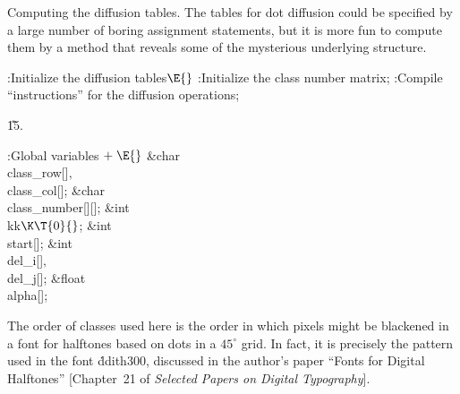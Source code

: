 Computing the diffusion tables. The tables for dot
diffusion could be
specified by a large number of boring assignment statements, but it is more
fun to compute them by a method that reveals some of the mysterious underlying
structure.

\Y\B\4:Initialize the diffusion tables\X${}\E{}$\6
:Initialize the class number matrix\X;\6
:Compile ``instructions'' for the diffusion operations\X;\par
\U15.\fi

\B{}:Global variables\X${}\mathrel+\E{}$\6
\&{char} \\{class\_row}[]${},{}$ \\{class\_col}[];\6
\&{char} \\{class\_number}[][];%
\6
\&{int} \\{kk}${}\K\T{0}{}$;\6
\&{int} \\{start}[];\6
\&{int} \\{del\_i}[]${},{}$ \\{del\_j}[];\6
\&{float} \\{alpha}[];\par
\fi

The order of classes used here is the order in which
pixels might be
blackened in a font for halftones based on dots in a $45^\circ$ grid.
In fact, it is precisely the pattern used in the font \.{ddith300},
discussed in the author's paper ``Fonts for Digital Halftones''
[Chapter~21 of {\sl Selected Papers on Digital Typography\/}].

